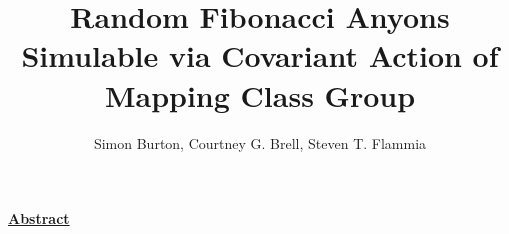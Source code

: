 \documentclass[12pt,a4paper]{article}
\begin{document}
\title{Random Fibonacci Anyons Simulable via Covariant Action of Mapping Class Group}

\author{Simon Burton, Courtney G. Brell, Steven T. Flammia}


%
%

%

\maketitle



\def\Complex {C}
\def\tensor{\otimes}
\def\Tensor{\bigotimes}
\def\bra #1{\langle #1|}
\def\ket #1{|#1\rangle}
\def\braket #1#2{\langle #1|#2 \rangle}



\def\mathZ{\mathbb{Z}}
\def\mathR{\mathbb{R}}


\def\heading #1{\vskip 20pt \noindent\underline{\large \bf #1}\vskip 5pt}

\def\important #1{\underline{\bf #1}}



\heading{Abstract}
\end{document}
